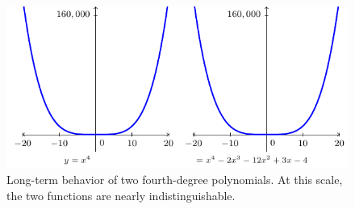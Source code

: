 \begin{figure}[ht!]
	\begin{center}
        \includegraphics[width=0.8\columnwidth]{figures/0-6-fig4.pdf}
	\end{center}      
\caption{Long-term behavior of two fourth-degree polynomials.  At this scale, the two functions are nearly indistinguishable.}
\label{F:0.6.PolyEndBehavior2}
\end{figure}

